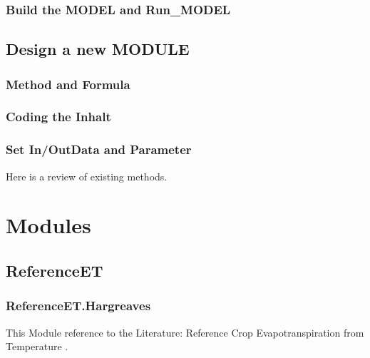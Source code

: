 \documentclass[
]{book}
\begin{document}
\hypertarget{build-the-model-and-run_model}{%
\subsection{Build the MODEL and Run\_MODEL}\label{build-the-model-and-run_model}}

\hypertarget{design-a-new-module}{%
\section{Design a new MODULE}\label{design-a-new-module}}

\hypertarget{method-and-formula}{%
\subsection{Method and Formula}\label{method-and-formula}}

\hypertarget{coding-the-inhalt}{%
\subsection{Coding the Inhalt}\label{coding-the-inhalt}}

\hypertarget{set-inoutdata-and-parameter}{%
\subsection{Set In/OutData and Parameter}\label{set-inoutdata-and-parameter}}

Here is a review of existing methods.

\hypertarget{module}{%
\chapter{Modules}\label{module}}

\hypertarget{referenceet}{%
\section{ReferenceET}\label{referenceet}}

\hypertarget{referenceet.hargreaves}{%
\subsection{ReferenceET.Hargreaves}\label{referenceet.hargreaves}}

This Module reference to the Literature: Reference Crop Evapotranspiration from Temperature \citep{GeorgeH.Hargreaves.1985}.
\end{document}

